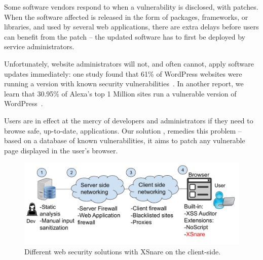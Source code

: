 Some software vendors respond to \xss when a vulnerability is
disclosed, with patches. When the software affected is released in
the form of packages, frameworks, or libraries, and used by several
web applications, there are extra delays before users can benefit from
the patch -- the updated software has to first be deployed by service
administrators.

Unfortunately, website administrators will not, and often cannot,
apply software updates immediately: one study found
that 61\% of WordPress websites were running a version with known
security vulnerabilities~\cite{Sucuri}. In another report, we learn
that 30.95\% of Alexa's top 1 Million sites run a vulnerable version
of WordPress~\cite{wpwhitesecurity}.

Users are in effect at the mercy of developers and administrators if
they need to browse safe, up-to-date, applications. Our solution \sys,
remedies this problem -- based on a database of known vulnerabilities,
it aims to patch any vulnerable page displayed in the user's browser.

\begin{figure}[h]
  \includegraphics[scale=0.37]{img/web_app_architecture_one.pdf}
  \vspace*{-5.0ex}
  \caption{Different web security solutions with XSnare on the client-side.}
  \label{fig:web_architecture}
\end{figure}

